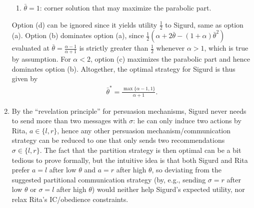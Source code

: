 \documentclass[a4paper]{article}
\begin{document}
\begin{enumerate}
\begin{enumerate}
		\item $\bar{\theta} = 1$: corner solution that may maximize the parabolic part.
	\end{enumerate}
	Option (d) can be ignored since it yields utility $\frac{1}{2}$ to Sigurd, same as option (a). Option (b) dominates option (a), since $\frac{1}{2} \left(\alpha + 2 \bar{\theta} - (1+\alpha) \bar{\theta}^2\right)$ evaluated at $\bar{\theta} = \frac{\alpha-1}{\alpha+1}$ is strictly greater than $\frac{1}{2}$ whenever $\alpha > 1$, which is true by assumption. For $\alpha < 2$, option (c) maximizes the parabolic part and hence dominates option (b). 
	Altogether, the optimal strategy for Sigurd is thus given by
	\begin{align*}
		\bar{\theta}^* 
		= \frac{ \max \{ \alpha-1 , 1 \} }{\alpha+1}.
	\end{align*}
	
	\item By the ``revelation principle'' for persuasion mechanisms, Sigurd never needs to send more than two messages with $\sigma$: he can only induce two actions by Rita, $a \in \{l,r\}$, hence any other persuasion mechanism/communication strategy can be reduced to one that only sends two recommendations $\sigma \in \{l,r\}$. The fact that the partition strategy is then optimal can be a bit tedious to prove formally, but the intuitive idea is that both Sigurd and Rita prefer $a=l$ after low $\theta$ and $a=r$ after high $\theta$, so deviating from the suggested partitional communication strategy (by, e.g., sending $\sigma=r$ after low $\theta$ or $\sigma=l$ after high $\theta$) would neither help Sigurd's expected utility, nor relax Rita's IC/obedience constraints.	
\end{enumerate}
\fi 
\end{document}
